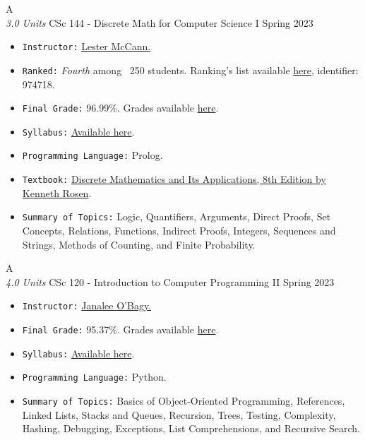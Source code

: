 \cventry
{A \\ \small{\textit{3.0 Units}}}
{CSc 144 - Discrete Math for Computer Science I}
{Spring 2023}
{}
{}
{
  \begin{itemize}
    \item \texttt{Instructor:} \href{http://mccann.cs.arizona.edu}{Lester McCann.}
    \item \texttt{Ranked:} \textit{Fourth} among ~250 students. Ranking's list available \href{https://mhrezaei.com/assets/cv/courses/Spring2023/CSC144/Rankings.pdf}{here}, identifier: 974718.
    \item \texttt{Final Grade:} 96.99\%. Grades available \href{https://mhrezaei.com/assets/cv/courses/Spring2023/CSC144/Grades.pdf}{here}.
    \item \texttt{Syllabus:} \href{https://mhrezaei.com/assets/cv/courses/Spring2023/CSC144/Syllabus.pdf}{Available here}.
    \item \texttt{Programming Language:} Prolog.
    \item \texttt{Textbook:} \href{https://www.mheducation.com/highered/product/M125967651X.html}{Discrete Mathematics and Its Applications, 8th Edition by Kenneth Rosen}.
    \item \texttt{Summary of Topics:} Logic, Quantifiers, Arguments, Direct Proofs, Set Concepts, Relations, Functions, Indirect Proofs, Integers, Sequences and Strings, Methods of Counting, and Finite Probability.
  \end{itemize}
}

\cventry
{A \\ \small{\textit{4.0 Units}}}
{CSc 120 - Introduction to Computer Programming II}
{Spring 2023}
{}
{}
{
  \begin{itemize}
    \item \texttt{Instructor:} \href{https://cs.arizona.edu/person/janalee-obagy-0}{Janalee O'Bagy.}
    \item \texttt{Final Grade:} 95.37\%. Grades available \href{https://mhrezaei.com/assets/cv/courses/Spring2023/CSC120/Grades.pdf}{here}.
    \item \texttt{Syllabus:} \href{https://mhrezaei.com/assets/cv/courses/Spring2023/CSC120/Syllabus.pdf}{Available here}.
    \item \texttt{Programming Language:} Python.
    \item \texttt{Summary of Topics:} Basics of Object-Oriented Programming, References, Linked Lists, Stacks and Queues, Recursion, Trees, Testing, Complexity, Hashing, Debugging, Exceptions, List Comprehensions, and Recursive Search.
  \end{itemize}
}

